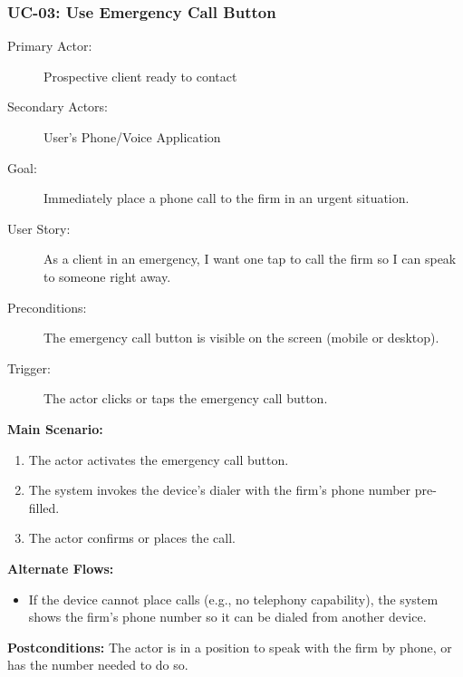 \documentclass{article}
\begin{document}
\subsubsection{UC-03: Use Emergency Call Button}
\begin{description}
  \item[Primary Actor:] Prospective client ready to contact
  \item[Secondary Actors:] User's Phone/Voice Application
  \item[Goal:] Immediately place a phone call to the firm in an urgent situation.
  \item[User Story:] As a client in an emergency, I want one tap to call the firm so I can speak to someone right away.
  \item[Preconditions:] The emergency call button is visible on the screen (mobile or desktop).
  \item[Trigger:] The actor clicks or taps the emergency call button.
\end{description}
\textbf{Main Scenario:}
\begin{enumerate}
  \item The actor activates the emergency call button.
  \item The system invokes the device's dialer with the firm's phone number pre-filled.
  \item The actor confirms or places the call.
\end{enumerate}
\textbf{Alternate Flows:}
\begin{itemize}
  \item If the device cannot place calls (e.g., no telephony capability), the system shows the firm's phone number so it can be dialed from another device.
\end{itemize}
\textbf{Postconditions:} The actor is in a position to speak with the firm by phone, or has the number needed to do so.

\newpage
\end{document}
